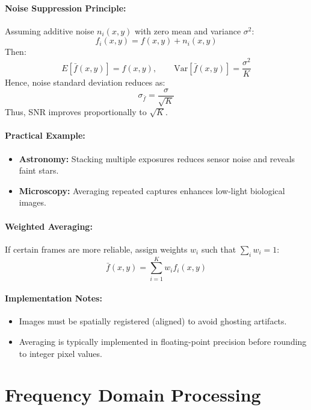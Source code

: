 \documentclass[12pt,a4paper]{AnantDocumentation}
\begin{document}
\paragraph{Noise Suppression Principle:}  
Assuming additive noise $n_i(x, y)$ with zero mean and variance $\sigma^2$:
\[
f_i(x, y) = f(x, y) + n_i(x, y)
\]
Then:
\[
E[\bar{f}(x, y)] = f(x, y), \qquad \text{Var}[\bar{f}(x, y)] = \frac{\sigma^2}{K}
\]
Hence, noise standard deviation reduces as:
\[
\sigma_{\bar{f}} = \frac{\sigma}{\sqrt{K}}
\]
Thus, SNR improves proportionally to $\sqrt{K}$.

\paragraph{Practical Example:}
\begin{itemize}
\item \textbf{Astronomy:} Stacking multiple exposures reduces sensor noise and reveals faint stars.
\item \textbf{Microscopy:} Averaging repeated captures enhances low-light biological images.
\end{itemize}

\paragraph{Weighted Averaging:}
If certain frames are more reliable, assign weights $w_i$ such that $\sum_i w_i = 1$:
\begin{equation}
\bar{f}(x, y) = \sum_{i=1}^{K} w_i f_i(x, y)
\end{equation}

\paragraph{Implementation Notes:}
\begin{itemize}
\item Images must be spatially registered (aligned) to avoid ghosting artifacts.
\item Averaging is typically implemented in floating-point precision before rounding to integer pixel values.
\end{itemize}


\section{Frequency Domain Processing}
\end{document}
